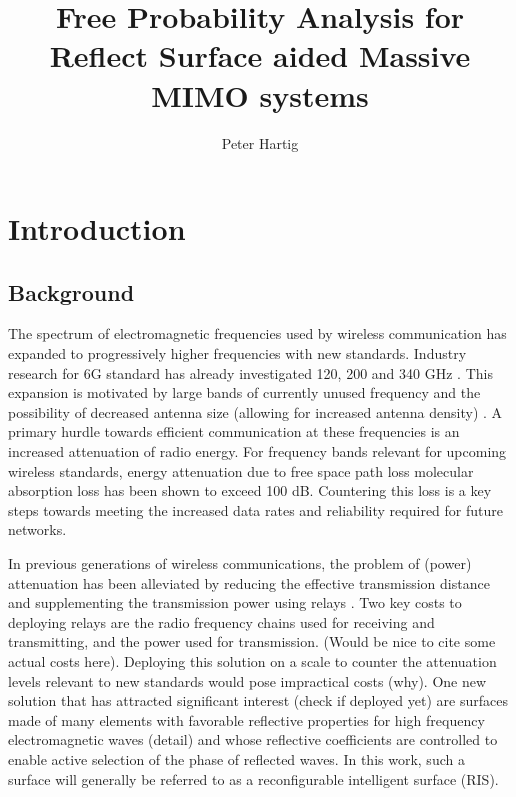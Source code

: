\documentclass[12pt,a4paper]{report}
\title{Free Probability Analysis for Reflect Surface aided Massive MIMO systems}
\author{Peter Hartig}
\begin{document}
\maketitle
\begin{abstract}

\end{abstract}
%
\tableofcontents
\chapter{Introduction}
\section{Background}\label{Background}
The spectrum of electromagnetic frequencies used by wireless communication has expanded to progressively higher frequencies with new standards. Industry research for 6G standard has already investigated 120, 200 and 340 GHz \cite{Koziol}. This expansion is motivated by large bands of currently unused frequency
and the possibility of decreased antenna size (allowing for increased antenna density) \cite{akyildiz2018combating}. A primary hurdle towards efficient communication at these frequencies is an increased attenuation of radio energy. For frequency bands relevant for upcoming wireless standards, energy attenuation due to free space path loss  molecular absorption loss
has been shown to exceed 100 dB. Countering this loss is a key steps towards meeting the increased data rates and reliability required for future networks.
\par
In previous generations of wireless communications, the problem of (power) attenuation has been alleviated by reducing the effective transmission distance 
and supplementing the transmission power using relays \cite{dahlman20134g}. Two key costs to deploying relays are the radio frequency chains used for receiving and transmitting, and the power used for transmission. (Would be nice to cite some actual costs here). Deploying this solution on a scale to counter
the attenuation levels relevant to new standards would pose impractical costs (why). One new solution that has attracted significant interest (check if deployed yet) are surfaces made of many elements with favorable reflective properties for high frequency electromagnetic waves (detail) and whose reflective coefficients are controlled to enable active selection of the phase of reflected waves. In this work, such a surface will generally be referred to as a reconfigurable intelligent surface (RIS).
\par
\end{document}
